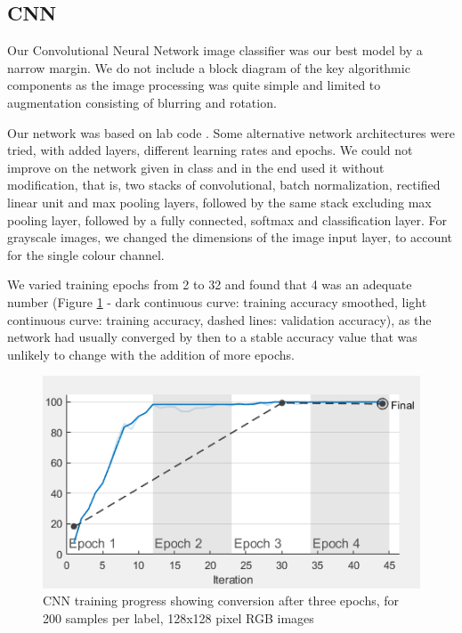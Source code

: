 \subsection{CNN}
\label{CNN-label}

Our Convolutional Neural Network image classifier was our best model by a narrow margin. We do not include a block diagram of the key algorithmic components as the image processing was quite simple and limited to augmentation consisting of blurring and rotation.  

Our network was based on lab code \cite{INM460-lab-wk8}. Some alternative network architectures were tried, with added layers, different learning rates and epochs. We could not improve on the network given in class and in the end used it without modification, that is, two stacks of convolutional, batch normalization, rectified linear unit and max pooling layers, followed by the same stack excluding max pooling layer, followed by a fully connected, softmax and classification layer. For grayscale images, we changed the dimensions of the image input layer, to account for the single colour channel.

We varied training epochs from 2 to 32 and found that 4 was an adequate number (Figure \ref{fig:cnn_training_progress} - dark continuous curve: training accuracy smoothed, light continuous curve: training accuracy, dashed lines: validation accuracy), as the network had usually converged by then to a stable accuracy value that was unlikely to change with the addition of more epochs.

\begin{figure}[h]
 \centering 
 \includegraphics[width=\columnwidth]{images/cnn-training-progress.png}
 \caption{CNN training progress showing conversion after three epochs, for 200 samples per label, 128x128 pixel RGB images}
 \label{fig:cnn_training_progress}
\end{figure}

